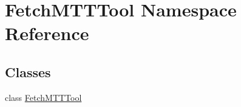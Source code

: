 \hypertarget{namespace_fetch_m_t_t_tool}{\section{Fetch\-M\-T\-T\-Tool Namespace Reference}
\label{namespace_fetch_m_t_t_tool}
}
\subsection*{Classes}
\begin{DoxyCompactItemize}
\item 
class \hyperlink{class_fetch_m_t_t_tool_1_1_fetch_m_t_t_tool}{Fetch\-M\-T\-T\-Tool}
\end{DoxyCompactItemize}
